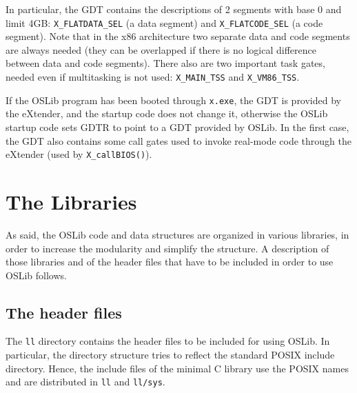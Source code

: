 \documentclass[a4paper]{report}
\begin{document}
In particular, the GDT contains the descriptions of 2 segments with
base 0 and limit 4GB: {\tt X\_FLATDATA\_SEL} (a data segment) and
{\tt X\_FLATCODE\_SEL} (a code segment). Note that in the x86
architecture two separate data and code segments are always needed
(they can be overlapped if there is no logical difference between data
and code segments). There also are two important task gates, needed even
if multitasking is not used: {\tt X\_MAIN\_TSS} and {\tt X\_VM86\_TSS}.

If the OSLib program has been booted through {\tt x.exe}, the GDT is
provided by the eXtender, and the startup code does not change it,
otherwise the OSLib startup code sets GDTR to point to a GDT provided
by OSLib. In the first case, the GDT also contains some call gates used
to invoke real-mode code through the eXtender (used by {\tt X\_callBIOS()}).


\chapter{The Libraries}
As said, the OSLib code and data structures are organized in various
libraries, in order to increase the modularity and simplify the
structure. A description of those libraries and of the header files
that have to be included in order to use OSLib follows.

\section{The header files}
The {\tt ll} directory contains the header files to be included for
using OSLib. In particular, the directory structure tries to reflect
the standard POSIX include directory. Hence, the include files of the
minimal C library use the POSIX names and are distributed in {\tt ll}
and {\tt ll/sys}.
\end{document}
